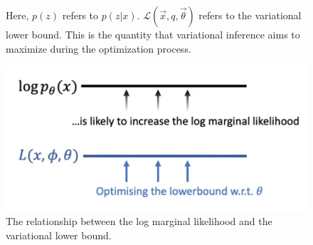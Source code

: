 \documentclass[11pt]{article}
\begin{document}
\begin{figure}[H]
    \caption*{Here, $p(z)$ refers to $p(z|x)$. $\mathcal L (\vec x, q, \vec \theta)$ refers to the variational lower bound. This is the quantity that variational inference aims to maximize during the optimization process.}
\end{figure}

\begin{figure}[H]
    \centering
    \includegraphics[width=.6\linewidth]{figures/variational-a-e.png}
    \caption{The relationship between the log marginal likelihood and the variational lower bound. }
\end{figure}
\end{document}
